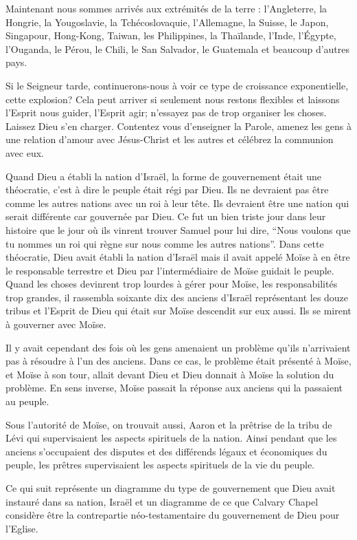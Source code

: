 Maintenant nous sommes arrivés aux extrémités de la terre : l’Angleterre, la Hongrie, la Yougoslavie, la
Tchécoslovaquie, l’Allemagne, la Suisse, le Japon, Singapour, Hong-Kong, Taiwan, les Philippines, la Thaïlande, l’Inde,
l’Égypte, l’Ouganda, le Pérou, le Chili, le San Salvador, le Guatemala et beaucoup d’autres pays.

Si le Seigneur tarde, continuerons-nous à voir ce type de croissance exponentielle, cette explosion? Cela peut arriver
si seulement nous restons flexibles et laissons l’Esprit nous guider, l’Esprit agir; n’essayez pas de trop organiser les
choses. Laissez Dieu s’en charger. Contentez vous d’enseigner la Parole, amenez les gens à une relation d’amour avec
Jésus-Christ et les autres et célébrez la communion avec eux.

Quand Dieu a établi la nation d’Israël, la forme de gouvernement était une théocratie, c’est à dire le peuple était régi
par Dieu. Ils ne devraient pas être comme les autres nations avec un roi à leur tête. Ils devraient être une nation qui
serait différente car gouvernée par Dieu. Ce fut un bien triste jour dans leur histoire que le jour où ils vinrent trouver
Samuel pour lui dire, “Nous voulons que tu nommes un roi qui règne sur nous comme les autres nations”. Dans cette
théocratie, Dieu avait établi la nation d’Israël mais il avait appelé Moïse à en être le responsable terrestre et Dieu par
l’intermédiaire de Moïse guidait le peuple. Quand les choses devinrent trop lourdes à gérer pour Moïse, les
responsabilités trop grandes, il rassembla soixante dix des anciens d’Israël représentant les douze tribus et l’Esprit de
Dieu qui était sur Moïse descendit sur eux aussi. Ils se mirent à gouverner avec Moïse.

Il y avait cependant des fois où les gens amenaient un problème qu’ils n’arrivaient pas à résoudre à l’un des anciens.
Dans ce cas, le problème était présenté à Moïse, et Moïse à son tour, allait devant Dieu et Dieu donnait à Moïse la
solution du problème. En sens inverse, Moïse passait la réponse aux anciens qui la passaient au peuple.

Sous l’autorité de Moïse, on trouvait aussi, Aaron et la prêtrise de la tribu de Lévi qui supervisaient les aspects
spirituels de la nation. Ainsi pendant que les anciens s’occupaient des disputes et des différends légaux et
économiques du peuple, les prêtres supervisaient les aspects spirituels de la vie du peuple.

Ce qui suit représente un diagramme du type de gouvernement que Dieu avait instauré dans sa nation, Israël et un
diagramme de ce que Calvary Chapel considère être la contrepartie néo-testamentaire du gouvernement de Dieu pour
l’Eglise.

